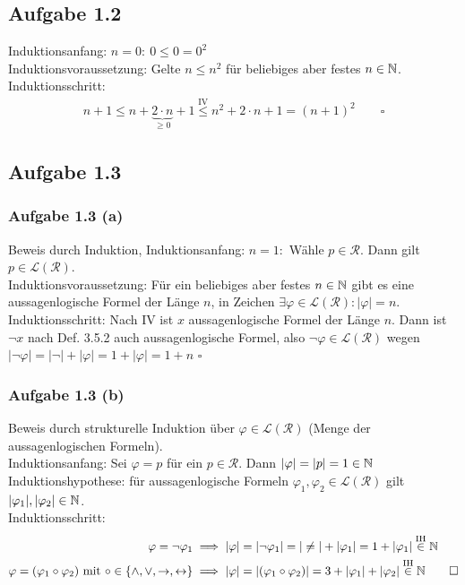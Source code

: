 \subsection{Aufgabe 1.2}
Induktionsanfang: $n=0:~0\leq0=0^2$\\
Induktionsvoraussetzung: Gelte $n\leq n^2$ für beliebiges aber festes $n\in\mathbb{N}$.\\
Induktionsschritt: 
\begin{align*}
	n+1\leq
	n+\underbrace{2\cdot n}_{\geq0}+1
	\overset{\text{IV}}{\leq} n^2+2\cdot n+1=(n+1)^2\qquad\square
\end{align*}

\subsection{Aufgabe 1.3}
\subsubsection{Aufgabe 1.3 (a)}
Beweis durch Induktion, Induktionsanfang: $n=1:$ Wähle $p\in\mathcal{R}$. 
Dann gilt $p\in\mathcal{L}(\mathcal{R})$.\\
Induktionsvoraussetzung: Für ein beliebiges aber festes $n\in\mathbb{N}$ gibt es eine aussagenlogische Formel der Länge $n$, in Zeichen $\exists\varphi\in\mathcal{L}(\mathcal{R}):|\varphi|=n$.\\
Induktionsschritt: Nach IV ist $x$ aussagenlogische Formel der Länge $n$. 
Dann ist $\neg x$ nach Def. 3.5.2 auch aussagenlogische Formel, also $\neg\varphi\in\mathcal{L}(\mathcal{R})$ wegen
$|\neg\varphi|=|\neg|+|\varphi|=1+|\varphi|=1+n$ $\square$

\subsubsection{Aufgabe 1.3 (b)}
Beweis durch strukturelle Induktion über $\varphi\in\mathcal{L}(\mathcal{R})$ (Menge der aussagenlogischen Formeln).\\
Induktionsanfang: Sei $\varphi=p$ für ein $p\in\mathcal{R}$. Dann $|\varphi|=|p|=1\in\mathbb{N}$\\
Induktionshypothese: für aussagenlogische Formeln $\varphi_1,\varphi_2\in\mathcal{L}(\mathcal{R})$ gilt $|\varphi_1|,|\varphi_2|\in\mathbb{N}$.\\
Induktionsschritt: 
\begin{align*}
	\varphi=\neg\varphi_1&\implies|\varphi|=|\neg\varphi_1|=|\neq|+|\varphi_1|=1+|\varphi_1|\stackrel{\text{IH}}{\in}\mathbb{N}\\
	\varphi=(\varphi_1\circ\varphi_2)\text{ mit }\circ\in\lbrace\wedge,\vee,\to,\leftrightarrow\rbrace&\implies|\varphi|=|(\varphi_1\circ\varphi_2)|=3+|\varphi_1|+|\varphi_2|\stackrel{\text{IH}}{\in}\mathbb{N}\qquad\square
\end{align*}

